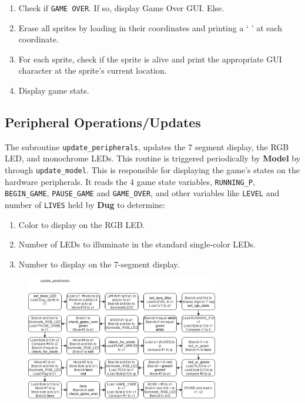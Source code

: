     \begin{enumerate}
      \item Check if \texttt{GAME OVER}. If so, display Game Over GUI. Else.
      \item Erase all sprites by loading in their coordinates and printing a ` ' at each coordinate.
      \item For each sprite, check if the sprite is alive and print the appropriate GUI character at the sprite's current location.
      \item Display game stats.
    \end{enumerate}


  \subsection{Peripheral Operations/Updates}
 
  The subroutine \texttt{update\_peripherals}, updates the 7 segment display, the RGB LED,
  and monochrome LEDs. 
  This routine is triggered periodically by \textbf{Model} by through \texttt{update\_model}.
  This is responsible for displaying the game's states on the hardware
  peripherals. It reads the 4 game state variables, \texttt{RUNNING\_P}, \texttt{BEGIN\_GAME},
  \texttt{PAUSE\_GAME} and \texttt{GAME\_OVER}, and other variables like \texttt{LEVEL} and number of \texttt{LIVES}
  held by \textbf{Dug} to determine:
  
  \begin{enumerate}
    \item Color to display on the RGB LED.
    \item Number of LEDs to illuminate in the standard single-color LEDs.
    \item Number to display on the 7-segment display.
  \end{enumerate}

  \begin{figure}[H]
    \centering
    \includegraphics[width=0.75\textwidth]{images/update_peripherals.png}
  \end{figure}
